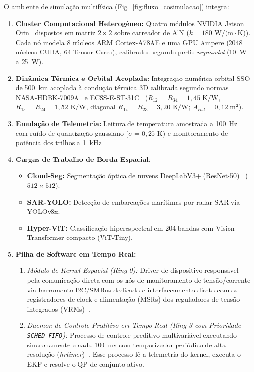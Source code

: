 \documentclass[journal]{IEEEtran}
\begin{document}
O ambiente de simulação multifísica (Fig.~\ref{fig:fluxo_cosimulacao}) integra:
\begin{enumerate}
    \item \textbf{Cluster Computacional Heterogêneo:} Quatro módulos NVIDIA Jetson Orin~\cite{ortiz2024spirit} dispostos em matriz $2 \times 2$ sobre carreador de AlN ($k = 180\text{ W/(m}\cdot\text{K)}$). Cada nó modela 8 núcleos ARM Cortex-A78AE e uma GPU Ampere (2048 núcleos CUDA, 64 Tensor Cores), calibrados segundo perfis \textit{nvpmodel} (10~W a 25~W).
    \item \textbf{Dinâmica Térmica e Orbital Acoplada:} Integração numérica orbital SSO de 500~km acoplada à condução térmica 3D calibrada segundo normas NASA-HDBK-7009A~\cite{nasa2022handbook} e ECSS-E-ST-31C~\cite{ecss2008thermal} ($R_{12} = R_{34} = 1{,}45\text{ K/W}$, $R_{13} = R_{24} = 1{,}52\text{ K/W}$, diagonal $R_{14} = R_{23} = 3{,}20\text{ K/W}$; $A_{rad} = 0{,}12\text{ m}^2$).
    \item \textbf{Emulação de Telemetria:} Leitura de temperatura amostrada a 100~Hz com ruído de quantização gaussiano ($\sigma = 0{,}25\text{ K}$) e monitoramento de potência dos trilhos a 1~kHz.
    \item \textbf{Cargas de Trabalho de Borda Espacial:}
    \begin{itemize}
        \item \textbf{Cloud-Seg:} Segmentação óptica de nuvens DeepLabV3+ (ResNet-50)~\cite{giuffrida2021phisat1, sherwood2003ase} ($512 \times 512$).
        \item \textbf{SAR-YOLO:} Detecção de embarcações marítimas por radar SAR via YOLOv8x.
        \item \textbf{Hyper-ViT:} Classificação hiperespectral em 204 bandas com Vision Transformer compacto (ViT-Tiny).
    \end{itemize}
    \item \textbf{Pilha de Software em Tempo Real:}
    \begin{enumerate}
        \item \textit{Módulo de Kernel Espacial (Ring 0):} Driver de dispositivo responsável pela comunicação direta com os nós de monitoramento de tensão/corrente via barramento I2C/SMBus dedicado e interfaceamento direto com os registradores de clock e alimentação (MSRs) dos reguladores de tensão integrados (VRMs)~\cite{corbet2005ldd, pallipadi2006ondemand}.
        \item \textit{Daemon de Controle Preditivo em Tempo Real (Ring 3 com Prioridade \texttt{SCHED\_FIFO}):} Processo de controle preditivo multivariável executando sincronamente a cada 100~ms com temporizador periódico de alta resolução (\textit{hrtimer})~\cite{gleixner2006hrtimers}. Esse processo lê a telemetria do kernel, executa o EKF e resolve o QP de conjunto ativo.

\end{enumerate}
\end{enumerate}
\end{document}
